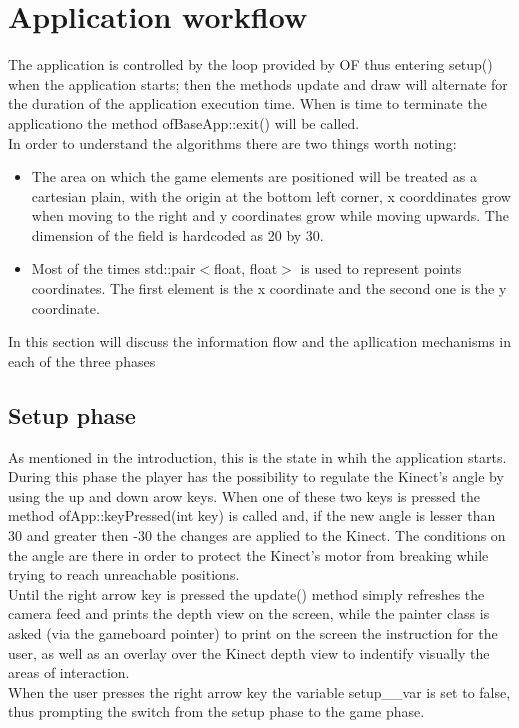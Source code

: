 \documentclass[]{article}
\begin{document}
\section{Application workflow}
The application is controlled by the loop provided by OF thus entering setup() when the application starts; then the methods update and draw will alternate for the duration of the application execution time. When is time to terminate the applicationo the method ofBaseApp::exit() will be called.\\
In order to understand the algorithms there are two things worth noting:
\begin{itemize}
	\item The area on which the game elements are positioned will be treated as a cartesian plain, with the origin at the bottom left corner, x coorddinates grow when moving to the right and y coordinates grow while moving upwards. The dimension of the field is hardcoded as 20 by 30.
	\item Most of the times std::pair$<$float, float$>$ is used to represent points coordinates. The first element is the x coordinate and the second one is the y coordinate. 
\end{itemize} 
In this section will discuss the information flow and the apllication mechanisms in each of the three phases
\subsection{Setup phase}
As mentioned in the introduction, this is the state in whih the application starts. During this phase the player has the possibility to regulate the Kinect's angle by using the up and down arow keys. When one of these
two keys is pressed the method ofApp::keyPressed(int key) is called and, if the new angle is lesser than 30 and greater then -30 the changes are applied to the Kinect.
The conditions on the angle are there in order to protect the Kinect's motor from breaking while trying to reach unreachable positions.\\
Until the right arrow key is pressed the update() method simply refreshes the camera feed and prints the depth view on the screen, while the painter class is asked (via the gameboard pointer) to print on the screen the instruction for the user, as well as an overlay over the Kinect depth view to indentify visually the areas of interaction.\\
When the user presses the right arrow key the variable setup\_\_var is set to false, thus prompting the switch from the setup phase to the game phase.
\newpage
\end{document}
